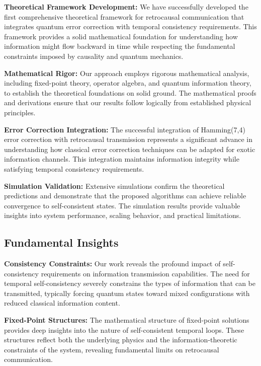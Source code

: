 \documentclass[12pt,a4paper]{article}
\begin{document}
\textbf{Theoretical Framework Development:} We have successfully developed the first comprehensive theoretical framework for retrocausal communication that integrates quantum error correction with temporal consistency requirements. This framework provides a solid mathematical foundation for understanding how information might flow backward in time while respecting the fundamental constraints imposed by causality and quantum mechanics.

\textbf{Mathematical Rigor:} Our approach employs rigorous mathematical analysis, including fixed-point theory, operator algebra, and quantum information theory, to establish the theoretical foundations on solid ground. The mathematical proofs and derivations ensure that our results follow logically from established physical principles.

\textbf{Error Correction Integration:} The successful integration of Hamming(7,4) error correction with retrocausal transmission represents a significant advance in understanding how classical error correction techniques can be adapted for exotic information channels. This integration maintains information integrity while satisfying temporal consistency requirements.

\textbf{Simulation Validation:} Extensive simulations confirm the theoretical predictions and demonstrate that the proposed algorithms can achieve reliable convergence to self-consistent states. The simulation results provide valuable insights into system performance, scaling behavior, and practical limitations.

\subsection{Fundamental Insights}

\textbf{Consistency Constraints:} Our work reveals the profound impact of self-consistency requirements on information transmission capabilities. The need for temporal self-consistency severely constrains the types of information that can be transmitted, typically forcing quantum states toward mixed configurations with reduced classical information content.

\textbf{Fixed-Point Structures:} The mathematical structure of fixed-point solutions provides deep insights into the nature of self-consistent temporal loops. These structures reflect both the underlying physics and the information-theoretic constraints of the system, revealing fundamental limits on retrocausal communication.
\end{document}
